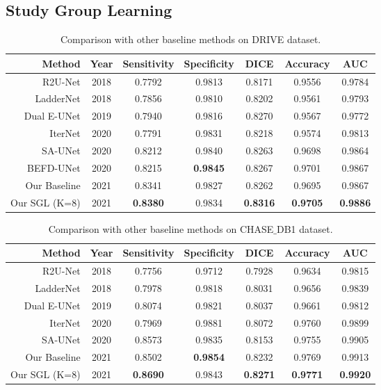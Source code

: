 \documentclass[runningheads]{llncs}
\begin{document}
\subsection{Study Group Learning}


\begin{table}[t]\setlength{\tabcolsep}{5pt}
\centering
\footnotesize
\caption{Comparison with other baseline methods on DRIVE dataset. }
\begin{tabular}{|r|c|c|c|c|c|c|}
\hline
Method & Year & Sensitivity & Specificity & DICE & Accuracy & AUC \\ \hline
R2U-Net \cite{alom2019recurrent}    & 2018 &0.7792 &0.9813 &0.8171 &0.9556 &0.9784\\
LadderNet \cite{zhuang2018laddernet} & 2018 &0.7856 &0.9810 &0.8202 &0.9561 &0.9793\\
Dual E-UNet \cite{wang2019dual}   &2019 &0.7940 &0.9816 &0.8270 &0.9567 &0.9772\\
IterNet \cite{li2020iternet}     &2020 &0.7791 &0.9831 &0.8218 &0.9574 &0.9813\\
SA-UNet \cite{guo2020sa}     &2020 &0.8212 &0.9840 &0.8263 &0.9698 &0.9864\\
BEFD-UNet \cite{zhang2020befd}& 2020 &0.8215 &\bf{0.9845} &0.8267& 0.9701& 0.9867 \\\hline
Our Baseline &2021 &0.8341 &0.9827 &0.8262 &0.9695 &0.9867 \\ 
Our SGL (K=8) &2021&\bf{0.8380} &0.9834 &\bf{0.8316} &\bf{0.9705} &\bf{0.9886} \\\hline

\end{tabular}\label{exp:drive}
\end{table}

\begin{table}[t]\setlength{\tabcolsep}{5pt}
\centering
\footnotesize
\caption{Comparison with other baseline methods on CHASE$\_$DB1 dataset. }
\begin{tabular}{|r|c|c|c|c|c|c|}
\hline
Method & Year & Sensitivity & Specificity & DICE & Accuracy & AUC \\\hline
R2U-Net \cite{alom2019recurrent}    & 2018 &0.7756 &0.9712 &0.7928&0.9634 &0.9815\\
LadderNet \cite{zhuang2018laddernet} & 2018 &0.7978 &0.9818 &0.8031 &0.9656 &0.9839\\

Dual E-UNet \cite{wang2019dual}   &2019 &0.8074 &0.9821 &0.8037 &0.9661 &0.9812\\
IterNet \cite{li2020iternet}     &2020 &0.7969 &0.9881 &0.8072 &0.9760 &0.9899\\
SA-UNet \cite{guo2020sa}     &2020 &0.8573 &0.9835 &0.8153 &0.9755 &0.9905\\

\hline
Our Baseline &2021 &0.8502 &\bf{0.9854} &0.8232 &0.9769 &0.9913 \\ 
 Our SGL (K=8) &2021&\bf{0.8690} &0.9843 &\bf{0.8271} &\bf{0.9771} &\bf{0.9920} \\\hline
\end{tabular}\label{exp:chase}
\vspace{-4mm}
\end{table}
\end{document}
